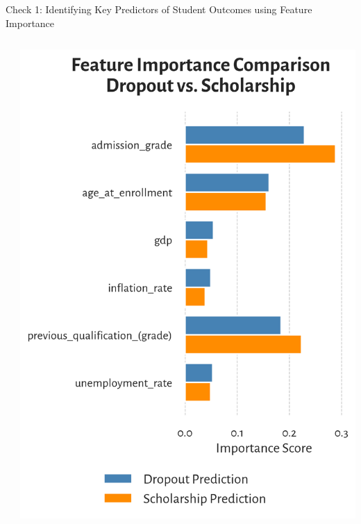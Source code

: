 \documentclass[aspectratio=169]{beamer}
\begin{document}
\begin{frame}{Check 1: Identifying Key Predictors of Student Outcomes using Feature Importance}
\begin{columns}
\begin{column}{0.65\textwidth}
\end{column}
\begin{column}{0.35\textwidth}
\raggedright
\hspace*{-0.6cm}
\vspace*{-0.9cm}
\includegraphics[width=1.05\linewidth]{Tex_Pictures/feature_importance_combined}
\end{column}
\end{columns}

\end{frame}
\end{document}
